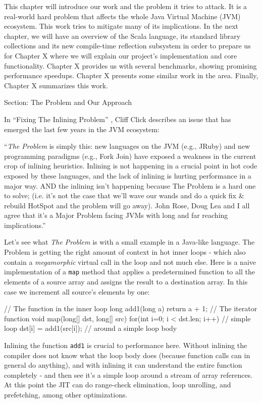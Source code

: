 This chapter will introduce our work and the problem it tries to attack. It is a
real-world hard problem that affects the whole Java Virtual Machine (JVM) 
ecosystem. This work tries to mitigate many of its implications. In the next chapter, we
will have an overview of the Scala language, its standard library collections and its new
compile-time reflection subsystem in order to prepare us for Chapter X
where we will explain our project's implementation and core functionality.
Chapter X provides us with several benchmarks, showing promising performance
speedups. Chapter X presents some similar work in the area. Finally, Chapter X
summarizes this work.

Section: The Problem and Our Approach

In ``Fixing The Inlining Problem'' , Cliff Click describes an issue
that has emerged the last few years in the JVM ecosystem:

``\emph{The Problem} is simply this: new languages on the JVM (e.g., JRuby) and new
programming paradigms (e.g., Fork Join) have exposed a weakness in the current
crop of inlining heuristics.  Inlining is not happening in a crucial point in
hot code exposed by these languages, and the lack of inlining is hurting
performance in a major way.  AND the inlining isn't happening because The
Problem is a hard one to solve; (i.e. it's not the case that we'll wave our
wands and do a quick fix \& rebuild HotSpot and the problem will go away).  
John Rose, Doug Lea and I all agree that it's a Major Problem facing JVMs with long
and far reaching implications.''

Let's see what \emph{The Problem} is with a small example in a Java-like language. The
Problem is getting the right amount of context in hot inner loops - which also
contain a \emph{megamorphic} virtual call in the loop and not much else.  Here is a
naive implementation of a \texttt{map} method that applies a predetermined
function to all the elements of a source array and assigns the result to a
destination array. In this case we increment all source's elements by one:

\begin{javaCode}
// The function in the inner loop
long add1(long a) {return a + 1;}
// The iterator function
void map(long[] dst, long[] src) {
  for(int i=0; i < dst.len; i++) // simple loop
    dst[i] = add1(src[i]); // around a simple loop body
}
\end{javaCode}

Inlining the function \texttt{add1} is crucial to performance here.  Without
inlining the compiler does not know what the loop body does (because function
calls can in general do anything), and with inlining it can understand the
entire function completely - and then see it's a simple loop around a stream of
array references.  At this point the JIT can do range-check elimination, loop
unrolling, and prefetching, among other optimizations.

